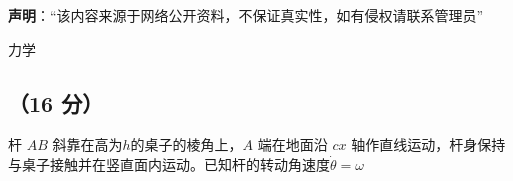 
\textbf{声明}：“该内容来源于网络公开资料，不保证真实性，如有侵权请联系管理员”

力学
\subsection{（16 分）}
杆 $AB$ 斜靠在高为$h$的桌子的棱角上，$A$ 端在地面沿 $cx$ 轴作直线运动，杆身保持与桌子接触并在竖直面内运动。已知杆的转动角速度$\dot{\theta}=\omega$
